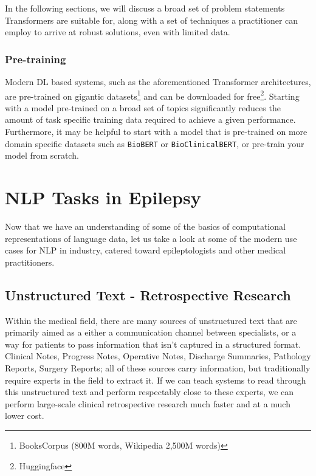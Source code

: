 In the following sections, we will discuss a broad set of problem statements Transformers are suitable for, along with a set of techniques a practitioner can employ to arrive at robust solutions, even with limited data.

\subsubsection{Pre-training}
Modern DL based systems, such as the aforementioned Transformer architectures, are pre-trained on gigantic datasets\footnote{BooksCorpus (800M words, Wikipedia 2,500M words)}\cite{bertpaper} and can be downloaded for free\footnote{Huggingface}.
Starting with a model pre-trained on a broad set of topics significantly reduces the amount of task specific training data required to achieve a given performance.
Furthermore, it may be helpful to start with a model that is pre-trained on more domain specific datasets such as \texttt{BioBERT\cite{DBLP:journals/corr/abs-1901-08746}} or \texttt{Bio\textunderscore ClinicalBERT\cite{clinicalbert}}, or pre-train your model from scratch.

\section{NLP Tasks in Epilepsy}

Now that we have an understanding of some of the basics of computational representations of language data, let us take a look at some of the modern use cases for NLP in industry, catered toward epileptologists and other medical practitioners.


\subsection{Unstructured Text - Retrospective Research}
Within the medical field, there are many sources of unstructured text that are primarily aimed as a either a communication channel between specialists, or a way for patients to pass information that isn't captured in a structured format.
Clinical Notes, Progress Notes, Operative Notes, Discharge Summaries, Pathology Reports, Surgery Reports; all of these sources carry information, but traditionally require experts in the field to extract it.
If we can teach systems to read through this unstructured text and perform respectably close to these experts, we can perform large-scale clinical retrospective research much faster and at a much lower cost.

